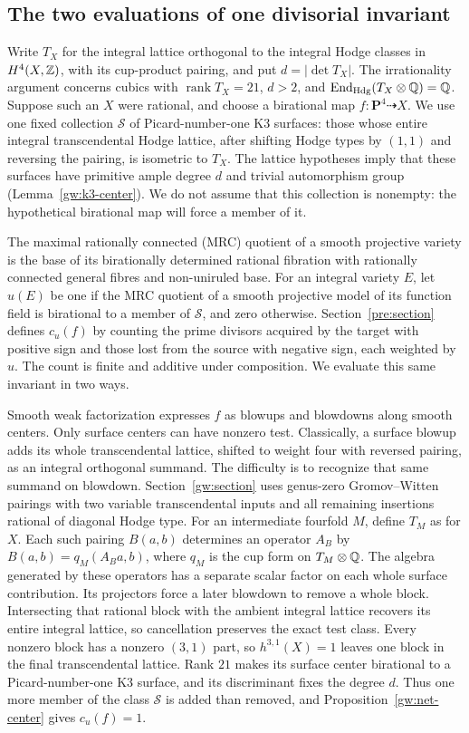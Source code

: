 \subsection{The two evaluations of one divisorial invariant}

Write \(T_X\) for the integral lattice orthogonal to the integral
Hodge classes in \(H^4(X,\mathbb Z)\), with its cup-product pairing, and put
\(d=|\det T_X|\). The irrationality argument concerns cubics with
\(\operatorname{rank}T_X=21\), \(d>2\), and
\(\operatorname{End}_{\mathrm{Hdg}}(T_X\otimes\mathbb Q)=\mathbb Q\).
Suppose such an \(X\) were rational, and choose a birational map
\(f:\mathbf P^4\dashrightarrow X\).
We use one fixed collection \(\mathcal S\) of
Picard-number-one K3 surfaces: those whose entire integral
transcendental Hodge lattice, after shifting Hodge types by \((1,1)\)
and reversing the pairing, is isometric to \(T_X\).
The lattice hypotheses imply that these surfaces have primitive ample
degree \(d\) and trivial automorphism group
(Lemma~\ref{gw:k3-center}). We do not assume that this collection is
nonempty: the hypothetical birational map will force a member of it.

The maximal rationally connected (MRC) quotient of a smooth projective
variety is the base of its birationally determined rational fibration with
rationally connected general fibres and non-uniruled base.
For an integral variety \(E\), let \(u(E)\) be one if the MRC quotient
of a smooth projective model of its function field is birational to a
member of \(\mathcal S\), and zero otherwise. Section~\ref{pre:section} defines \(c_u(f)\) by counting the
prime divisors acquired by the target with positive sign and those
lost from the source with negative sign, each weighted by \(u\).
The count is finite and additive under composition. We evaluate this
same invariant in two ways.

Smooth weak factorization expresses \(f\) as blowups and blowdowns
along smooth centers. Only surface centers can have nonzero test.
Classically, a surface blowup adds its whole transcendental lattice,
shifted to weight four with reversed pairing, as an integral orthogonal
summand. The difficulty is to recognize that same summand on blowdown.
Section~\ref{gw:section} uses genus-zero Gromov--Witten pairings with
two variable transcendental inputs and all remaining insertions rational
of diagonal Hodge type. For an intermediate fourfold \(M\),
define \(T_M\) as for \(X\). Each such pairing \(B(a,b)\) determines an
operator \(A_B\) by
\(B(a,b)=q_M(A_Ba,b)\), where \(q_M\) is the cup form on
\(T_M\otimes\mathbb Q\). The algebra generated by these operators has a
separate scalar factor on each whole surface contribution. Its
projectors force a later blowdown to remove a whole block. Intersecting
that rational block with the ambient integral lattice recovers its
entire integral lattice, so cancellation preserves the exact test
class. Every nonzero block has a nonzero \((3,1)\) part, so
\(h^{3,1}(X)=1\) leaves one block in the final transcendental lattice.
Rank \(21\) makes its surface center birational to a
Picard-number-one K3 surface, and its discriminant fixes the degree
\(d\). Thus one more member of the class \(\mathcal S\) is added than
removed, and Proposition~\ref{gw:net-center} gives \(c_u(f)=1\).

